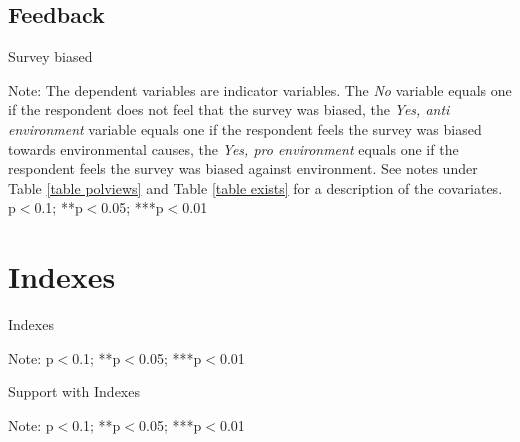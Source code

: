 \documentclass{article}
\begin{document}
\clearpage
\subsection{Feedback}



\begin{table}[h!]
	\caption{Survey biased}
	\begin{center}
		\scalebox{0.7}{}
	\end{center}
	{\footnotesize Note: The dependent variables are indicator variables. The \textit{No} variable equals one if the respondent does not feel that the survey was biased, the \textit{Yes, anti environment} variable equals one if the respondent feels the survey was biased towards environmental causes, the \textit{Yes, pro environment} equals one if the respondent feels the survey was biased against environment. See notes under Table \ref{table polviews} and Table \ref{table exists} for a description of the covariates.
	\newline *p$<$0.1; **p$<$0.05; ***p$<$0.01}
\end{table}	


\clearpage
\section{Indexes}



\begin{table}[h!]
	\caption{Indexes}
	\begin{center}
		\scalebox{0.7}{}
	\end{center}
	{\footnotesize Note: 
	\newline *p$<$0.1; **p$<$0.05; ***p$<$0.01}
\end{table}	

\begin{table}[h!]
	\caption{Support with Indexes}
	\begin{center}
		\scalebox{0.7}{}
	\end{center}
	{\footnotesize Note: 
	\newline *p$<$0.1; **p$<$0.05; ***p$<$0.01}
\end{table}	
\end{document}
